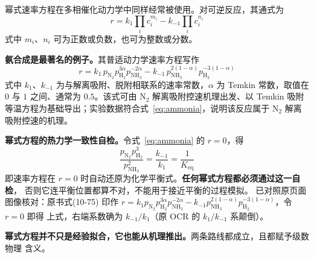 幂式速率方程在多相催化动力学中同样经常被使用。对可逆反应，其通式为
\begin{equation}
r=k_1\prod_i c_i^{m_i}-k_{-1}\prod_i c_i^{n_i}
\label{eq:power-rev}
\end{equation}
式中 $m_i$、$n_i$ 可为正数或负数，也可为整数或分数。

\textbf{氨合成是最著名的例子。}其普适动力学速率方程写作
\begin{equation}
r=k_1\,p_{\mathrm{N_2}}p_{\mathrm{H_2}}^{3\alpha}p_{\mathrm{NH_3}}^{-2\alpha}
-k_{-1}\,p_{\mathrm{NH_3}}^{2(1-\alpha)}p_{\mathrm{H_2}}^{-3(1-\alpha)}
\label{eq:ammonia}
\end{equation}
式中 $k_1$、$k_{-1}$ 为与解离吸附、脱附相联系的速率常数，$\alpha$ 为 Temkin 常数，取值在
$0$ 与 $1$ 之间、通常为 $0.5$。该式可由 $\mathrm{N_2}$ 解离吸附控速机理出发、以 Temkin
吸附等温方程为基础导出；实验数据符合式~\eqref{eq:ammonia}，说明该反应属于
$\mathrm{N_2}$ 解离吸附控速的机理。

\begin{principle}
\textbf{幂式方程的热力学一致性自检。}令式~\eqref{eq:ammonia} 的 $r=0$，得
\begin{equation}
\frac{p_{\mathrm{N_2}}p_{\mathrm{H_2}}^{3}}{p_{\mathrm{NH_3}}^{2}}
=\frac{k_{-1}}{k_1}=\frac{1}{K_{\mathrm{eq}}}
\label{eq:ammonia-eq}
\end{equation}
即速率方程在 $r=0$ 时自动还原为化学平衡式。\textbf{任何幂式方程都必须通过这一自检}，
否则它连平衡位置都算不对，不能用于接近平衡的过程模拟。
已对照原页面图像核对：原书式(10-75) 印作
$r=k_1p_{\mathrm{N_2}}p_{\mathrm{H_2}}^{3\alpha}p_{\mathrm{NH_3}}^{-2\alpha}
-k_{-1}p_{\mathrm{NH_3}}^{2(1-\alpha)}p_{\mathrm{H_2}}^{-3(1-\alpha)}$，令 $r=0$ 即得
上式，右端系数确为 $k_{-1}/k_1$（原 OCR 的 $k_1/k_{-1}$ 系颠倒）。
\end{principle}

\textbf{幂式方程并不只是经验拟合，它也能从机理推出。}两条路线都成立，且都赋予级数物理
含义。

